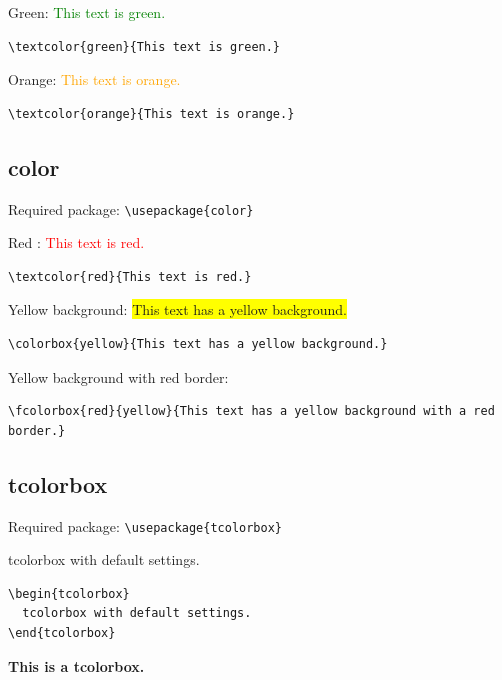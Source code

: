 \documentclass[12pt]{article}
\begin{document}
Green: \textcolor{green}{This text is green.}
\begin{verbatim}
\textcolor{green}{This text is green.}
\end{verbatim}

Orange: \textcolor{orange}{This text is orange.}
\begin{verbatim}
\textcolor{orange}{This text is orange.}
\end{verbatim}

\subsection{color}
Required package: \verb|\usepackage{color}|

Red : \textcolor{red}{This text is red.}
\begin{verbatim}
\textcolor{red}{This text is red.}
\end{verbatim}

Yellow background: \colorbox{yellow}{This text has a yellow background.}
\begin{verbatim}
\colorbox{yellow}{This text has a yellow background.}
\end{verbatim}

Yellow background with red border: \\

\begin{verbatim}
\fcolorbox{red}{yellow}{This text has a yellow background with a red border.}
\end{verbatim}


\subsection{tcolorbox}
Required package: \verb|\usepackage{tcolorbox}|


\begin{tcolorbox}
  tcolorbox with default settings.
\end{tcolorbox}

\begin{verbatim}
\begin{tcolorbox}
  tcolorbox with default settings.
\end{tcolorbox}
\end{verbatim}

\begin{tcolorbox}[colback=green,colframe=blue,title=Example]
\textbf{This is a tcolorbox.}
\end{tcolorbox}
\end{document}
